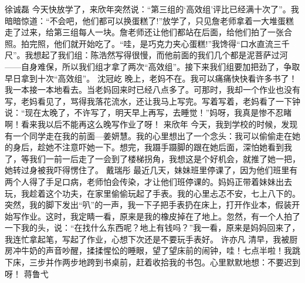 {}\markdownRendererInterblockSeparator
{}徐诚磊\markdownRendererInterblockSeparator
{}今天快放学了，来欣年突然说：“第三组的‘高效组’评比已经满十次了”。我暗暗惊道：“不会吧，他们都可以换蛋糕了!”放学了，只见詹老师拿着一大堆蛋糕走了过来，给第三组每人一块。詹老师还让他们都站在后面，给他们拍了一张合照。拍完照，他们就开始吃了。“哇，是巧克力夹心蛋糕!”我馋得“口水直流三千尺”。我想起了我们组：陈浩然写得很慢，而他前面的我们几个都是泥菩萨过河——自身难保，所以我们组才拿了两次“高效组”。接下来我们组要加把劲了，争取早日拿到十次“高效组”。\markdownRendererInterblockSeparator
{}\markdownRendererInterblockSeparator
{}沈冠屹\markdownRendererInterblockSeparator
{}晚上，老妈不在。我可以痛痛快快看许多书了！我一本接一本地看去。当老妈回来时已经八点多了。可那时，我却一个作业也没有写，老妈看见了，骂得我落花流水，还让我马上写完。写着写着，老妈看了一下钟说：“现在太晚了，不许写了，明天早上再写，去睡觉！”妈呀，我真是惨不忍睹啊！看来我以后不能再这么晚写作业了呀！\markdownRendererInterblockSeparator
{}\markdownRendererInterblockSeparator
{}来欣年\markdownRendererInterblockSeparator
{}今天，我到学校的时候，发现有一个同学走在我的前面—姜妍慧。我的心里想出了一个念头：我可以偷偷走在她的身后，趁她不注意吓她一下。想完，我蹑手蹑脚的跟在她后面，深怕她看到我了，等我们一前一后走了一会到了楼梯拐角，我想这是个好机会，就推了她一把，她转过身被我吓得愣住了。\markdownRendererInterblockSeparator
{}\markdownRendererInterblockSeparator
{}戴瑞彤\markdownRendererInterblockSeparator
{}最近几天，妹妹班里停课了，因为他们班里有两个人得了手足口病，老师怕会传染，才让他们班停课的。妈妈正带着妹妹出去玩，我趁着这个功夫，在家里偷偷玩起了手表。我的心里忐忑不安，七上八下的。突然，我的脚下发出“叭”的一声，我一下子把手表扔在床上，打开作业本，假装开始写作业。这时，我定睛一看，原来是我的橡皮掉在了地上。忽然，有一个人拍了一下我的头，说：“在找什么东西呢？地上有钱吗？”我一看，原来是妈妈回来了，我连忙拿起笔，写起了作业，心想下次还是不要玩手表好。\markdownRendererInterblockSeparator
{}\markdownRendererInterblockSeparator
{}许亦凡\markdownRendererInterblockSeparator
{}清早，我被厨房冲牛奶的声音吵醒，揉揉惺忪的睡眼，望了望床前的闹钟，哇！七点半啦！我跳下床，三步并作两步地跨到书桌前，赶着收拾我的书包。心里默默地想：不要迟到呀！\markdownRendererInterblockSeparator
{}\markdownRendererInterblockSeparator
{}蒋鲁弋\markdownRendererInterblockSeparator
